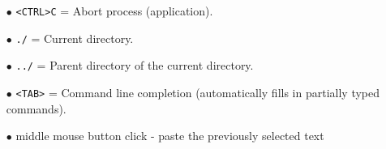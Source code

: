 \begin{itemize}
	\item[$\bullet$] \texttt{<CTRL>C} = Abort process (application).
	\item[$\bullet$] \texttt{./} = Current directory.
	\item[$\bullet$] \texttt{../} = Parent directory of the current directory.
	\item[$\bullet$] \texttt{<TAB>} = Command line completion (automatically fills in partially typed commands).
	\item[$\bullet$] middle mouse button click - paste the previously selected text
\end{itemize}

